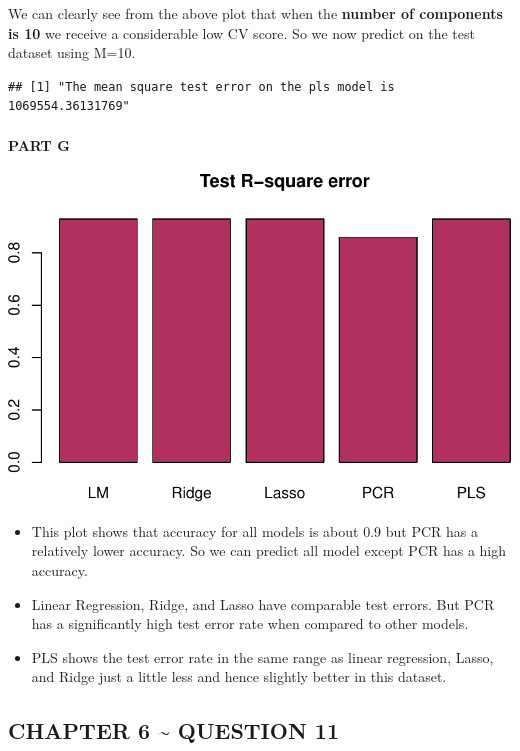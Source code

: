 \documentclass[
]{article}
\begin{document}
We can clearly see from the above plot that when the \textbf{number of
components is 10} we receive a considerable low CV score. So we now
predict on the test dataset using M=10.

\begin{verbatim}
## [1] "The mean square test error on the pls model is 1069554.36131769"
\end{verbatim}

\hypertarget{part-g-1}{%
\paragraph{\texorpdfstring{{PART G}}{PART G}}\label{part-g-1}}

\begin{center}\includegraphics{Disha_Gandhi_Take_Home_Exam_PDF_files/figure-latex/unnamed-chunk-57-1} \end{center}

\begin{itemize}
\item
  This plot shows that accuracy for all models is about 0.9 but PCR has
  a relatively lower accuracy. So we can predict all model except PCR
  has a high accuracy.
\item
  Linear Regression, Ridge, and Lasso have comparable test errors. But
  PCR has a significantly high test error rate when compared to other
  models.
\item
  PLS shows the test error rate in the same range as linear regression,
  Lasso, and Ridge just a little less and hence slightly better in this
  dataset.
\end{itemize}

\hypertarget{chapter-6-question-11}{%
\subsection{CHAPTER 6 \textasciitilde{} QUESTION
11}\label{chapter-6-question-11}}
\end{document}
